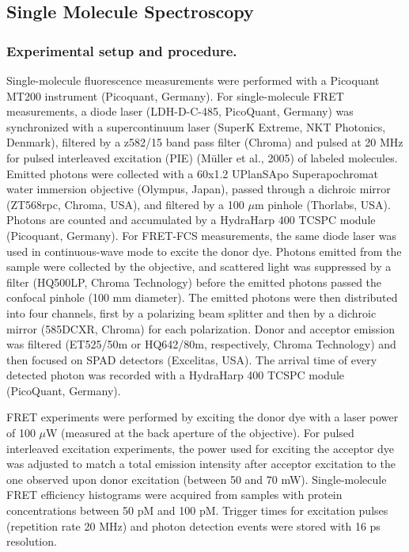 \documentclass[../main.tex]{subfiles}
\begin{document}
    \subsection{Single Molecule Spectroscopy}
    \subsubsection{Experimental setup and procedure.}
        Single-molecule fluorescence measurements were performed with a Picoquant MT200 instrument (Picoquant, Germany). For single-molecule FRET measurements, a diode laser (LDH-D-C-485, PicoQuant, Germany) was synchronized with a supercontinuum laser (SuperK Extreme, NKT Photonics, Denmark), filtered by a z582/15 band pass filter (Chroma) and pulsed at 20 MHz for pulsed interleaved excitation (PIE) (Müller et al., 2005) of labeled molecules. Emitted photons were collected with a 60x1.2 UPlanSApo Superapochromat water immersion objective (Olympus, Japan), passed through a dichroic mirror (ZT568rpc, Chroma, USA), and filtered by a 100 $\mu$m pinhole (Thorlabs, USA). Photons are counted and accumulated by a HydraHarp 400 TCSPC module (Picoquant, Germany). For FRET-FCS measurements, the same diode laser was used in continuous-wave mode to excite the donor dye. Photons emitted from the sample were collected by the objective, and scattered light was suppressed by a filter (HQ500LP, Chroma Technology) before the emitted photons passed the confocal pinhole (100 mm diameter). The emitted photons were then distributed into four channels, first by a polarizing beam splitter and then by a dichroic mirror (585DCXR, Chroma) for each polarization. Donor and acceptor emission was filtered (ET525/50m or HQ642/80m, respectively, Chroma Technology) and then focused on SPAD detectors (Excelitas, USA). The arrival time of every detected photon was recorded with a HydraHarp 400 TCSPC module (PicoQuant, Germany). 

        FRET experiments were performed by exciting the donor dye with a laser power of 100 $\mu$W (measured at the back aperture of the objective). For pulsed interleaved excitation experiments, the power used for exciting the acceptor dye was adjusted to match a total emission intensity after acceptor excitation to the one observed upon donor excitation (between 50 and 70 mW). Single-molecule FRET efficiency histograms were acquired from samples with protein concentrations between 50 pM and 100 pM. Trigger times for excitation pulses (repetition rate 20 MHz) and photon detection events were stored with 16 ps resolution. 
\end{document}

